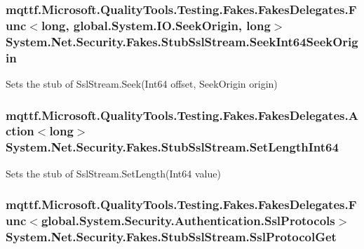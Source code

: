 \hypertarget{class_system_1_1_net_1_1_security_1_1_fakes_1_1_stub_ssl_stream_a060579846343665b6c4a4e7e6c3a91ec}{
\subsubsection[{Seek\-Int64\-Seek\-Origin}]{\setlength{\rightskip}{0pt plus 5cm}mqttf.\-Microsoft.\-Quality\-Tools.\-Testing.\-Fakes.\-Fakes\-Delegates.\-Func$<$long, global.\-System.\-I\-O.\-Seek\-Origin, long$>$ System.\-Net.\-Security.\-Fakes.\-Stub\-Ssl\-Stream.\-Seek\-Int64\-Seek\-Origin}}\label{class_system_1_1_net_1_1_security_1_1_fakes_1_1_stub_ssl_stream_a060579846343665b6c4a4e7e6c3a91ec}


Sets the stub of Ssl\-Stream.\-Seek(\-Int64 offset, Seek\-Origin origin)

\hypertarget{class_system_1_1_net_1_1_security_1_1_fakes_1_1_stub_ssl_stream_a956ab2130ac757633ae4cfb8087d0853}{
\subsubsection[{Set\-Length\-Int64}]{\setlength{\rightskip}{0pt plus 5cm}mqttf.\-Microsoft.\-Quality\-Tools.\-Testing.\-Fakes.\-Fakes\-Delegates.\-Action$<$long$>$ System.\-Net.\-Security.\-Fakes.\-Stub\-Ssl\-Stream.\-Set\-Length\-Int64}}\label{class_system_1_1_net_1_1_security_1_1_fakes_1_1_stub_ssl_stream_a956ab2130ac757633ae4cfb8087d0853}


Sets the stub of Ssl\-Stream.\-Set\-Length(\-Int64 value)

\hypertarget{class_system_1_1_net_1_1_security_1_1_fakes_1_1_stub_ssl_stream_a5c4489a8e393f1e8422140eba10b381e}{
\subsubsection[{Ssl\-Protocol\-Get}]{\setlength{\rightskip}{0pt plus 5cm}mqttf.\-Microsoft.\-Quality\-Tools.\-Testing.\-Fakes.\-Fakes\-Delegates.\-Func$<$global.\-System.\-Security.\-Authentication.\-Ssl\-Protocols$>$ System.\-Net.\-Security.\-Fakes.\-Stub\-Ssl\-Stream.\-Ssl\-Protocol\-Get}}\label{class_system_1_1_net_1_1_security_1_1_fakes_1_1_stub_ssl_stream_a5c4489a8e393f1e8422140eba10b381e}


